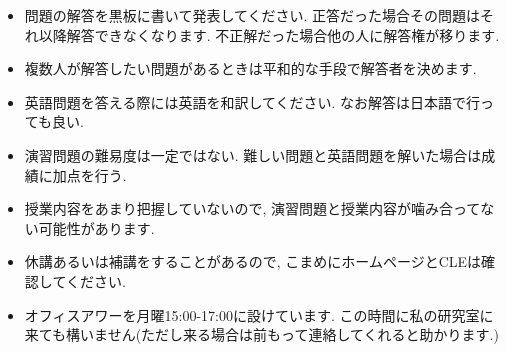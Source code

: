 \documentclass[dvipdfmx,a4paper,11pt]{article}
\theoremstyle{definition}
\begin{document}
\vspace{11pt}
\hspace{-18pt}{\large 解答の仕方について}
\begin{itemize}
  \setlength{\parskip}{0cm} %
  \setlength{\itemsep}{0cm} %
  \item 問題の解答を黒板に書いて発表してください. 正答だった場合その問題はそれ以降解答できなくなります. 不正解だった場合他の人に解答権が移ります. 
  \item 複数人が解答したい問題があるときは平和的な手段で解答者を決めます. 
  \item 英語問題を答える際には英語を和訳してください. なお解答は日本語で行っても良い.
  \item 演習問題の難易度は一定ではない. 難しい問題と英語問題を解いた場合は成績に加点を行う. 
 \end{itemize}


\vspace{11pt}
\hspace{-18pt}{\large その他}
\begin{itemize}
  \setlength{\parskip}{0cm} %
  \setlength{\itemsep}{0cm} %
    \item 授業内容をあまり把握していないので, 演習問題と授業内容が噛み合ってない可能性があります.
  \item 休講あるいは補講をすることがあるので, こまめにホームページとCLEは確認してください.
    \item オフィスアワーを月曜15:00-17:00に設けています. この時間に私の研究室に来ても構いません(ただし来る場合は前もって連絡してくれると助かります.)
 \end{itemize}
 
 

 
\end{document}
